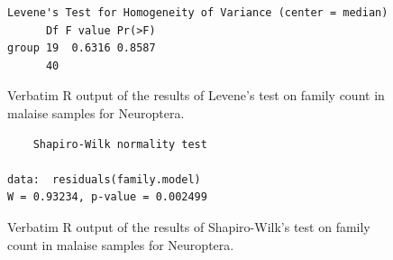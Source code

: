 \documentclass[10pt,letterpaper,twocolumn]{article}
\begin{document}
\begin{figure}[h]
	\lstset{numbers=left}
	\lstset{xleftmargin=5mm,framexleftmargin=5mm}
	\begin{lstlisting}
Levene's Test for Homogeneity of Variance (center = median)
      Df F value Pr(>F)
group 19  0.6316 0.8587
      40               
	\end{lstlisting}
	\caption{Verbatim R output of the results of Levene's test on family count in malaise samples for Neuroptera.}
	\label{fig:malaise_neuroptera_family_levene}
	\smallskip
	\nointerlineskip
	\hrulefill
\end{figure}

\begin{figure}[h]
	\lstset{numbers=left}
	\lstset{xleftmargin=5mm,framexleftmargin=5mm}
	\begin{lstlisting}
	Shapiro-Wilk normality test

data:  residuals(family.model)
W = 0.93234, p-value = 0.002499
	\end{lstlisting}
	\caption{Verbatim R output of the results of Shapiro-Wilk's test on family count in malaise samples for Neuroptera.}
	\label{fig:malaise_neuroptera_family_shapiro}
	\smallskip
	\nointerlineskip
	\hrulefill
\end{figure}
\end{document}
